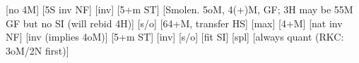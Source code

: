 \begin{bidsemi}
[no 4M]
    [5S inv NF]
    [inv]
    [5+m ST]
    [Smolen. 5oM, 4(+)M, GF; 3H may be 55M GF but no SI (will rebid 4H)]
    [s/o]
    [64+M, transfer HS]
        [max]
[4+M]
    [nat inv NF]
    [inv (implies 4oM)]
    [5+m ST]
    [inv]
    [s/o]
    [fit SI]
    [spl]
    [always quant (RKC: 3oM/2N first)]
\end{bidsemi}